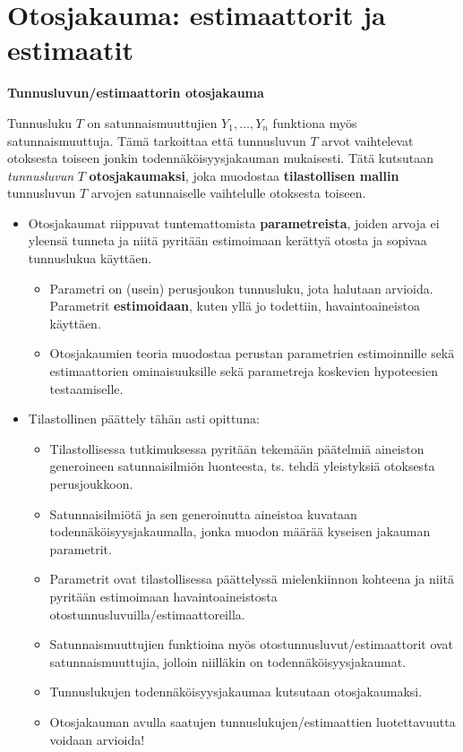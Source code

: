 \documentclass[
]{book}
\providecommand{\tightlist}{%
  \setlength{\itemsep}{0pt}\setlength{\parskip}{0pt}}
\begin{document}
\hypertarget{otosjakauma-estimaattorit-ja-estimaatit}{%
\section{Otosjakauma: estimaattorit ja estimaatit}\label{otosjakauma-estimaattorit-ja-estimaatit}}

\begin{defblock}{}
\textbf{Tunnusluvun/estimaattorin otosjakauma}

Tunnusluku \(T\) on satunnaismuuttujien \(Y_1,\dots,Y_n\) funktiona myös satunnaismuuttuja. Tämä tarkoittaa että tunnusluvun \(T\) arvot vaihtelevat otoksesta toiseen jonkin todennäköisyysjakauman mukaisesti. Tätä kutsutaan \emph{tunnusluvun} \(T\) \textbf{otosjakaumaksi}, joka muodostaa \textbf{tilastollisen mallin} tunnusluvun \(T\) arvojen satunnaiselle vaihtelulle otoksesta toiseen.

\end{defblock}

\begin{itemize}
\tightlist
\item
  Otosjakaumat riippuvat tuntemattomista \textbf{parametreista}, joiden arvoja ei yleensä tunneta ja niitä pyritään estimoimaan kerättyä otosta ja sopivaa tunnuslukua käyttäen.

  \begin{itemize}
  \tightlist
  \item
    Parametri on (usein) perusjoukon tunnusluku, jota halutaan arvioida. Parametrit \textbf{estimoidaan}, kuten yllä jo todettiin, havaintoaineistoa käyttäen.
  \item
    Otosjakaumien teoria muodostaa perustan parametrien estimoinnille sekä estimaattorien ominaisuuksille sekä parametreja koskevien hypoteesien testaamiselle.
  \end{itemize}
\item
  Tilastollinen päättely tähän asti opittuna:

  \begin{itemize}
  \tightlist
  \item
    Tilastollisessa tutkimuksessa pyritään tekemään päätelmiä aineiston generoineen satunnaisilmiön luonteesta, ts. tehdä yleistyksiä otoksesta perusjoukkoon.
  \item
    Satunnaisilmiötä ja sen generoinutta aineistoa kuvataan todennäköisyysjakaumalla, jonka muodon määrää kyseisen jakauman parametrit.
  \item
    Parametrit ovat tilastollisessa päättelyssä mielenkiinnon kohteena ja niitä pyritään estimoimaan havaintoaineistosta otostunnusluvuilla/estimaattoreilla.
  \item
    Satunnaismuuttujien funktioina myös otostunnusluvut/estimaattorit ovat satunnaismuuttujia, jolloin niilläkin on todennäköisyysjakaumat.
  \item
    Tunnuslukujen todennäköisyysjakaumaa kutsutaan otosjakaumaksi.
  \item
    Otosjakauman avulla saatujen tunnuslukujen/estimaattien luotettavuutta voidaan arvioida!
  \end{itemize}
\end{itemize}
\end{document}

